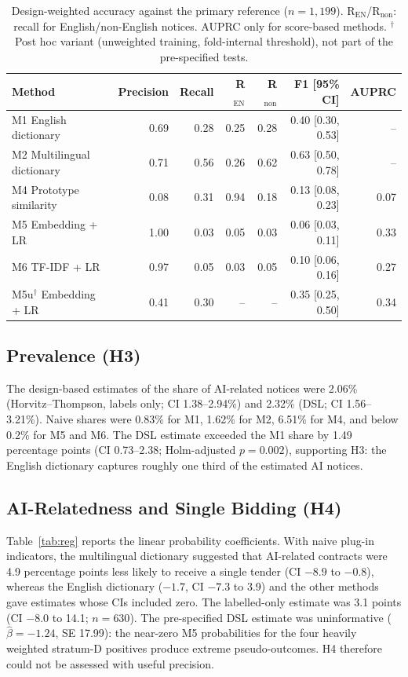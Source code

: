 \begin{table}[t]
\caption{Design-weighted accuracy against the primary reference ($n=1{,}199$). R$_\mathrm{EN}$/R$_\mathrm{non}$: recall for English/non-English notices. AUPRC only for score-based methods. $^\dagger$Post hoc variant (unweighted training, fold-internal threshold), not part of the pre-specified tests.}\label{tab:acc}
\centering
\begin{tabular}{lrrrrrr}
\toprule
Method & Precision & Recall & R$_\mathrm{EN}$ & R$_\mathrm{non}$ & F1 [95\% CI] & AUPRC \\
\midrule
M1 English dictionary & 0.69 & 0.28 & 0.25 & 0.28 & 0.40 [0.30, 0.53] & -- \\
M2 Multilingual dictionary & 0.71 & 0.56 & 0.26 & 0.62 & 0.63 [0.50, 0.78] & -- \\

M4 Prototype similarity & 0.08 & 0.31 & 0.94 & 0.18 & 0.13 [0.08, 0.23] & 0.07 \\
M5 Embedding + LR & 1.00 & 0.03 & 0.05 & 0.03 & 0.06 [0.03, 0.11] & 0.33 \\
M6 TF-IDF + LR & 0.97 & 0.05 & 0.03 & 0.05 & 0.10 [0.06, 0.16] & 0.27 \\
M5u$^\dagger$ Embedding + LR & 0.41 & 0.30 & -- & -- & 0.35 [0.25, 0.50] & 0.34 \\
\bottomrule
\end{tabular}
\end{table}

\subsection{Prevalence (H3)}
The design-based estimates of the share of AI-related notices were 2.06\% (Horvitz--Thompson, labels only; CI 1.38--2.94\%) and 2.32\% (DSL; CI 1.56--3.21\%). Naive shares were 0.83\% for M1, 1.62\% for M2, 6.51\% for M4, and below 0.2\% for M5 and M6. The DSL estimate exceeded the M1 share by 1.49 percentage points (CI 0.73--2.38; Holm-adjusted $p=0.002$), supporting H3: the English dictionary captures roughly one third of the estimated AI notices.

\subsection{AI-Relatedness and Single Bidding (H4)}
Table~\ref{tab:reg} reports the linear probability coefficients. With naive plug-in indicators, the multilingual dictionary suggested that AI-related contracts were 4.9 percentage points less likely to receive a single tender (CI $-8.9$ to $-0.8$), whereas the English dictionary ($-1.7$, CI $-7.3$ to 3.9) and the other methods gave estimates whose CIs included zero. The labelled-only estimate was 3.1 points (CI $-8.0$ to 14.1; $n=630$). The pre-specified DSL estimate was uninformative ($\hat\beta=-1.24$, SE 17.99): the near-zero M5 probabilities for the four heavily weighted stratum-D positives produce extreme pseudo-outcomes. H4 therefore could not be assessed with useful precision.

